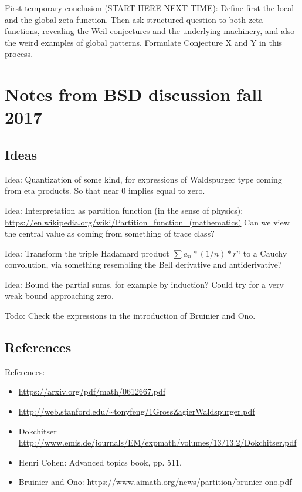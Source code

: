 \documentclass[paper=a4, fontsize=11pt]{scrartcl} %
\numberwithin{equation}{section} %
\numberwithin{figure}{section} %
\numberwithin{table}{section} %
\begin{document}
First temporary conclusion (START HERE NEXT TIME): Define first the local and the global zeta function. Then ask structured question to both zeta functions, revealing the Weil conjectures and the underlying machinery, and also the weird examples of global patterns. Formulate Conjecture X and Y in this process.




\appendix

\newpage
\section{Notes from BSD discussion fall 2017}

\subsection{Ideas}

Idea: Quantization of some kind, for expressions of Waldspurger type coming from eta products. So that near 0 implies equal to zero.

Idea: Interpretation as partition function (in the sense of physics):
\url{https://en.wikipedia.org/wiki/Partition_function_(mathematics)}
Can we view the central value as coming from something of trace class?

Idea: Transform the triple Hadamard product $\sum a_n * (1/n) * r^n$ to a Cauchy convolution, via something resembling the Bell derivative and antiderivative?

Idea: Bound the partial sums, for example by induction? Could try for a very weak bound approaching zero.

Todo: Check the expressions in the introduction of Bruinier and Ono.


\subsection{References}

References:

\begin{itemize}
\item \url{https://arxiv.org/pdf/math/0612667.pdf}
\item \url{http://web.stanford.edu/~tonyfeng/1GrossZagierWaldspurger.pdf}
\item Dokchitser \url{http://www.emis.de/journals/EM/expmath/volumes/13/13.2/Dokchitser.pdf}
\item Henri Cohen: Advanced topics book, pp. 511.
\item Bruinier and Ono: \url{https://www.aimath.org/news/partition/brunier-ono.pdf}
\end{itemize}
\end{document}
